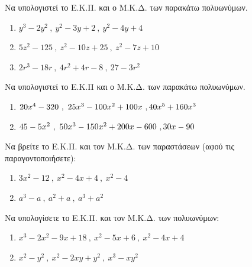 \documentclass[11pt,a4paper,modern]{FFExercises}
\begin{document}
\askhsh
Να υπολογιστεί το Ε.Κ.Π. και ο Μ.Κ.Δ. των παρακάτω πολυωνύμων.
\begin{enumerate}[label=\roman*.]
    \item $ y^3-2y^2\ ,\ y^2-3y+2\ ,\ y^2-4y+4 $
    \item $ 5z^2-125 \ ,\ z^2-10z+25\ ,\ z^2-7z+10 $
    \item $ 2r^3-18r\ ,\ 4r^2+4r-8\ ,\ 27-3r^2 $
\end{enumerate}

\askhsh
Να υπολογιστεί το Ε.Κ.Π και ο Μ.Κ.Δ. των παρακάτω πολυωνύμων.
\begin{enumerate}[label=\roman*.]
    \item $ 20x^4-320\ ,\ 25x^3-100x^2+100x\ ,\\ 40x^5+160x^3 $
    \item $ 45-5x^2\ ,\ 50x^3-150x^2+200x-600 \ ,\\30x-90 $
\end{enumerate}

\askhsh
Να βρείτε το Ε.Κ.Π. και τον Μ.Κ.Δ. των παραστάσεων (αφού τις παραγοντοποιήσετε):
\begin{enumerate}[label=\roman*.]
    \item $ 3x^2 - 12\ ,\ x^2 - 4x + 4\ ,\ x^2 - 4 $
    \item $ a^3 - a\ ,\ a^2 + a\ ,\ a^3 + a^2 $
\end{enumerate}

\askhsh
Να υπολογίσετε το Ε.Κ.Π. και τον Μ.Κ.Δ. των πολυωνύμων:
\begin{enumerate}[label=\roman*.]
    \item $ x^3 - 2x^2 - 9x + 18\ ,\ x^2 - 5x + 6\ ,\ x^2 - 4x + 4 $
    \item $ x^2 - y^2\ ,\ x^2 - 2xy + y^2\ ,\ x^3 - xy^2 $
\end{enumerate}
\end{document}
